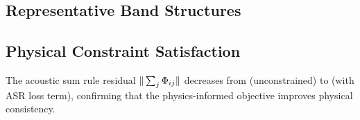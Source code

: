 \subsection{Representative Band Structures}


\subsection{Physical Constraint Satisfaction}

The acoustic sum rule residual $\|\sum_j\Phi_{ij}\|$ decreases
from  (unconstrained) to  (with ASR loss term),
confirming that the physics-informed objective improves
physical consistency.
